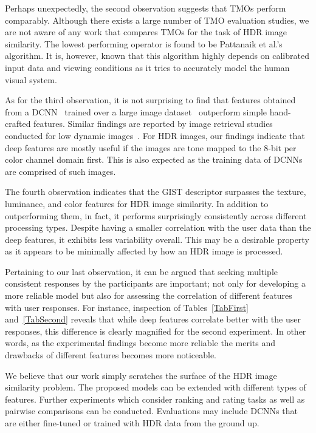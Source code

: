 Perhaps unexpectedly, the second observation suggests that TMOs perform comparably. 
Although there exists a large
number of TMO evaluation studies, we are not aware of any work that
compares TMOs for the task of HDR image similarity. The lowest
performing operator is found to be Pattanaik et
al.'s~\cite{pattanaik2000time} algorithm. It is, however, known that
this algorithm highly depends on calibrated input data and viewing
conditions as it tries to accurately model the human visual system.

As for the third observation, it is not surprising to find that 
features obtained from a DCNN~\cite{simon14} trained over a large image
dataset~\cite{russakovsky2015imagenet} outperform simple hand-crafted
features. Similar findings are reported by image retrieval studies
conducted for low dynamic images~\cite{wan2014deep,gordo2016deep}. For
HDR images, our findings indicate that deep features are mostly useful if the images are tone mapped to the 8-bit per color channel domain
first. This is also expected as the training data of DCNNs are comprised of such images.

The fourth observation indicates that the GIST descriptor surpasses the
texture, luminance, and color features for HDR image similarity. In
addition to outperforming them, in fact, it performs surprisingly
consistently across different processing types. Despite having a smaller
correlation with the user data than the deep features, it exhibits less
variability overall. This may be a desirable property as it appears to
be minimally affected by how an HDR image is processed.

Pertaining to our last observation, it can be argued that seeking multiple
consistent responses by the participants are important; not only for
developing a more reliable model but also for assessing the correlation
of different features with user responses. For instance, inspection of
Tables~\ref{TabFirst} and~\ref{TabSecond} reveals that while deep
features correlate better with the user responses, this difference is
clearly magnified for the second experiment. In other words, as the
experimental findings become more reliable the merits and drawbacks of
different features becomes more noticeable.

We believe that our work simply scratches the surface of the HDR
image similarity problem. The proposed models can be extended with different
types of features. Further experiments which consider ranking and rating
tasks as well as pairwise comparisons can be conducted. Evaluations may
include DCNNs that are either fine-tuned or trained with HDR data from
the ground up.